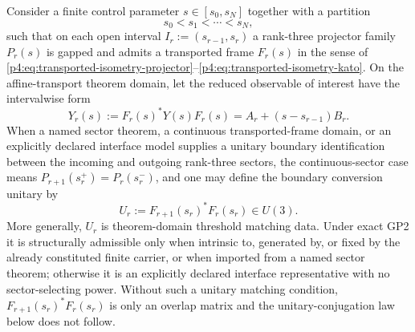 \documentclass[12pt,a4paper]{article}
\begin{document}
Consider a finite control parameter $s\in[s_0,s_N]$ together with a partition
\[
s_0<s_1<\cdots<s_N,
\]
such that on each open interval $I_r:=(s_{r-1},s_r)$ a rank-three projector family $P_r(s)$ is gapped and admits a transported frame $F_r(s)$ in the sense of \eqref{p4:eq:transported-isometry-projector}--\eqref{p4:eq:transported-isometry-kato}.
On the affine-transport theorem domain, let the reduced observable of interest have the intervalwise form
\begin{equation}
\label{p4:eq:piecewise-affine-local-form}
Y_r(s):=F_r(s)^*Y(s)F_r(s)=A_r+(s-s_{r-1})B_r.
\end{equation}
When a named sector theorem, a continuous transported-frame domain, or an explicitly declared interface model supplies a unitary boundary identification between the incoming and outgoing rank-three sectors, the continuous-sector case means $P_{r+1}(s_r^+)=P_r(s_r^-)$, and one may define the boundary conversion unitary by
\begin{equation}
\label{p4:eq:threshold-boundary-unitary}
U_r:=F_{r+1}(s_r)^*F_r(s_r)\in U(3).
\end{equation}
More generally, $U_r$ is theorem-domain threshold matching data.  Under exact GP2 it is structurally admissible only when intrinsic to, generated by, or fixed by the already constituted finite carrier, or when imported from a named sector theorem; otherwise it is an explicitly declared interface representative with no sector-selecting power.  Without such a unitary matching condition, $F_{r+1}(s_r)^*F_r(s_r)$ is only an overlap matrix and the unitary-conjugation law below does not follow.
\end{document}
